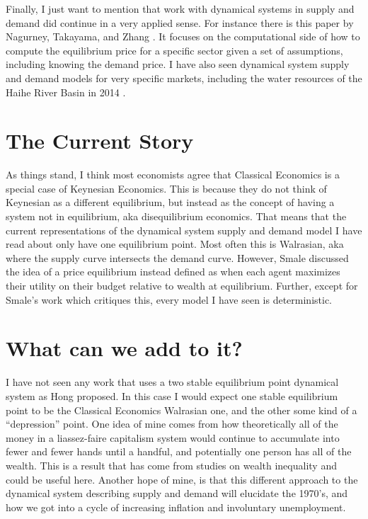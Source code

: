 \documentclass{article}
\begin{document}
Finally, I just want to mention that work with dynamical systems in supply and demand did continue in a very applied sense. For instance there is this paper by Nagurney, Takayama, and Zhang \cite{nagurney_massively_1995}. It focuses on the computational side of how to compute the equilibrium price for a specific sector given a set of assumptions, including knowing the demand price. I have also seen dynamical system supply and demand models for very specific markets, including the water resources of the Haihe River Basin in 2014 \cite{di_modeling_2014}.


\section{The Current Story}\label{current} %
As things stand, I think most economists agree that Classical Economics is a special case of Keynesian Economics. This is because they do not think of Keynesian as a different equilibrium, but instead as the concept of having a system not in equilibrium, aka disequilibrium economics. That means that the current representations of the dynamical system supply and demand model I have read about only have one equilibrium point. Most often this is Walrasian, aka where the supply curve intersects the demand curve. However, Smale discussed the idea of a price equilibrium instead defined as when each agent maximizes their utility on their budget relative to wealth at equilibrium. Further, except for Smale's work which critiques this, every model I have seen is deterministic.

\section{What can we add to it?}
I have not seen any work that uses a two stable equilibrium point dynamical system as Hong proposed. In this case I would expect one stable equilibrium point to be the Classical Economics Walrasian one, and the other some kind of a ``depression'' point. One idea of mine comes from how theoretically all of the money in a liassez-faire capitalism system would continue to accumulate into fewer and fewer hands until a handful, and potentially one person has all of the wealth. This is a result that has come from studies on wealth inequality and could be useful here. Another hope of mine, is that this different approach to the dynamical system describing supply and demand will elucidate the 1970's, and how we got into a cycle of increasing inflation and involuntary unemployment. 
\end{document}
